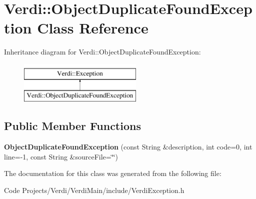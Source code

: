 \hypertarget{class_verdi_1_1_object_duplicate_found_exception}{\section{\-Verdi\-:\-:\-Object\-Duplicate\-Found\-Exception \-Class \-Reference}
\label{class_verdi_1_1_object_duplicate_found_exception}
}
\-Inheritance diagram for \-Verdi\-:\-:\-Object\-Duplicate\-Found\-Exception\-:\begin{figure}[H]
\begin{center}
\leavevmode
\includegraphics[height=2.000000cm]{class_verdi_1_1_object_duplicate_found_exception}
\end{center}
\end{figure}
\subsection*{\-Public \-Member \-Functions}
\begin{DoxyCompactItemize}
\item 
\hypertarget{class_verdi_1_1_object_duplicate_found_exception_a1c6f524cbfe7eb594ce87bdb7d9c0da6}{{\bfseries \-Object\-Duplicate\-Found\-Exception} (const \-String \&description, int code=0, int line=-\/1, const \-String \&source\-File=\char`\"{}\char`\"{})}\label{class_verdi_1_1_object_duplicate_found_exception_a1c6f524cbfe7eb594ce87bdb7d9c0da6}

\end{DoxyCompactItemize}


\-The documentation for this class was generated from the following file\-:\begin{DoxyCompactItemize}
\item 
\-Code Projects/\-Verdi/\-Verdi\-Main/include/\-Verdi\-Exception.\-h\end{DoxyCompactItemize}
